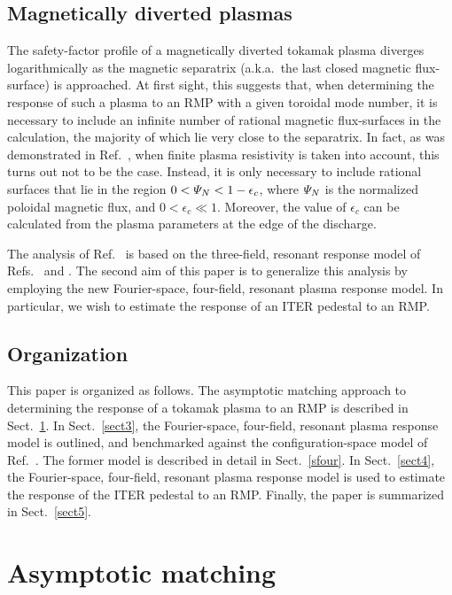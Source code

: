 \documentclass[12pt,prb,aps]{revtex4-1}
\begin{document}
 \subsection{Magnetically diverted plasmas}
 The safety-factor profile of a magnetically diverted tokamak plasma diverges logarithmically as the magnetic separatrix 
(a.k.a.\ the last closed magnetic flux-surface) is approached. At first sight, this suggests that, when determining the response of such a plasma to an RMP 
with a given toroidal mode number, it is necessary to include an infinite number of rational magnetic flux-surfaces in the calculation, the
majority of which lie  very close to the separatrix. In fact, as was demonstrated in Ref.~, when finite plasma resistivity is taken into account, this turns out not to be the case. 
Instead, it is only necessary to include rational surfaces that
lie in the region $0<{\mit\Psi}_N<1-\epsilon_c$, where ${\mit\Psi}_N$ is the normalized poloidal magnetic flux, and
$0<\epsilon_c\ll 1$. Moreover, the value of $\epsilon_c$ can be calculated from the plasma parameters at the edge of the discharge. 

The analysis of Ref.~ is based on the three-field, resonant response model of Refs.~ and .
The second aim of this paper is to generalize this analysis  by employing  the new Fourier-space, four-field, resonant plasma response model. In particular, we wish to estimate the response of
an ITER pedestal to an RMP. 

\subsection{Organization}
This paper is organized as follows. The asymptotic matching approach to determining the response of a tokamak plasma to an RMP is described in Sect.~\ref{sect1}. 
In Sect.~\ref{sect3}, the Fourier-space, four-field, resonant plasma response model is outlined, and benchmarked against the configuration-space model of Ref.~. The former model is described in detail in Sect.~\ref{sfour}. In Sect.~\ref{sect4}, the Fourier-space, four-field, resonant plasma response model is used to estimate the response of the ITER pedestal to an RMP. Finally, the paper is
summarized in Sect.~\ref{sect5}. 

\section{Asymptotic matching}\label{sect1}
\end{document}
